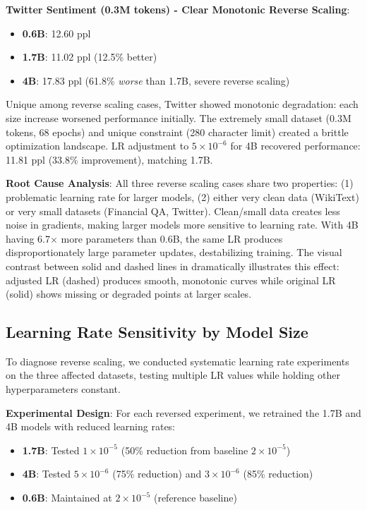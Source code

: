 \textbf{Twitter Sentiment (0.3M tokens) - Clear Monotonic Reverse Scaling}:
\begin{itemize}
\item \textbf{0.6B}: 12.60 ppl
\item \textbf{1.7B}: 11.02 ppl (12.5\% better)
\item \textbf{4B}: 17.83 ppl (61.8\% \textit{worse} than 1.7B, severe reverse scaling)
\end{itemize}

Unique among reverse scaling cases, Twitter showed monotonic degradation: each size increase worsened performance initially. The extremely small dataset (0.3M tokens, 68 epochs) and unique constraint (280 character limit) created a brittle optimization landscape. LR adjustment to $5 \times 10^{-6}$ for 4B recovered performance: 11.81 ppl (33.8\% improvement), matching 1.7B.

\textbf{Root Cause Analysis}: All three reverse scaling cases share two properties: (1) problematic learning rate for larger models, (2) either very clean data (WikiText) or very small datasets (Financial QA, Twitter). Clean/small data creates less noise in gradients, making larger models more sensitive to learning rate. With 4B having 6.7$\times$ more parameters than 0.6B, the same LR produces disproportionately large parameter updates, destabilizing training. The visual contrast between solid and dashed lines in  dramatically illustrates this effect: adjusted LR (dashed) produces smooth, monotonic curves while original LR (solid) shows missing or degraded points at larger scales.

\subsection{Learning Rate Sensitivity by Model Size}

To diagnose reverse scaling, we conducted systematic learning rate experiments on the three affected datasets, testing multiple LR values while holding other hyperparameters constant.

\textbf{Experimental Design}: For each reversed experiment, we retrained the 1.7B and 4B models with reduced learning rates:
\begin{itemize}
\item \textbf{1.7B}: Tested $1 \times 10^{-5}$ (50\% reduction from baseline $2 \times 10^{-5}$)
\item \textbf{4B}: Tested $5 \times 10^{-6}$ (75\% reduction) and $3 \times 10^{-6}$ (85\% reduction)
\item \textbf{0.6B}: Maintained at $2 \times 10^{-5}$ (reference baseline)
\end{itemize}

